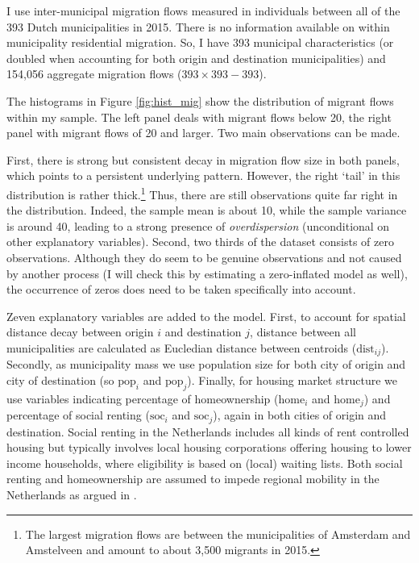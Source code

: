 \documentclass[fleqn,10pt]{SelfArx} %
\begin{document}
        I use inter-municipal migration flows measured in individuals
        between all of the 393 Dutch municipalities in 2015. There
        is no information available on within municipality residential
        migration. So, I have 393 municipal characteristics (or doubled
        when accounting for both origin and destination municipalities)
        and 154,056 aggregate migration flows ($393 \times 393 - 393$).

        The histograms in Figure \ref{fig:hist_mig} show the distribution of migrant
        flows within my sample. The left panel deals with migrant
        flows below 20, the right panel with migrant flows of 20 and
        larger. Two main observations can be made.

        First, there is strong but consistent decay in migration flow size in both panels,
        which points to a persistent underlying pattern. However, the
        right `tail' in this distribution is rather thick.\footnote{The
          largest migration flows are between the municipalities of
          Amsterdam and Amstelveen and amount to about 3,500
          migrants in 2015.} Thus, there are still observations quite far
        right in the distribution. Indeed, the sample mean is about
        10, while the sample variance is around 40, leading to a
        strong presence of \emph{overdispersion} (unconditional on
        other explanatory variables).  Second, two thirds of the
        dataset consists of zero observations. Although they do seem
        to be genuine observations and not caused by another process
        (I will check this by estimating a zero-inflated model as well),
         the occurrence of zeros does need to be taken
        specifically into account.

        Zeven explanatory variables are added to the model. First, to account for
        spatial distance decay between origin $i$ and destination $j$,
        distance between all municipalities are calculated as
        Eucledian distance between centroids
        ($\text{dist}_{ij}$). Secondly, as municipality mass we use
        population size for both city of origin and city of
        destination (so $\text{pop}_i$ and $\text{pop}_j$). Finally,
        for housing market structure we use variables indicating
        percentage of homeownership ($\text{home}_i$ and
        $\text{home}_j$) and percentage of social renting
        ($\text{soc}_i$ and $\text{soc}_j$), again in both cities of
        origin and destination. Social renting in the Netherlands
        includes all kinds of rent controlled housing but typically
        involves local housing corporations offering housing to lower
        income households, where eligibility is based on (local)
        waiting lists. Both social renting and homeownership are
        assumed to impede regional mobility in the Netherlands as argued in
        \citet{de2009homeownership}.
\end{document}
